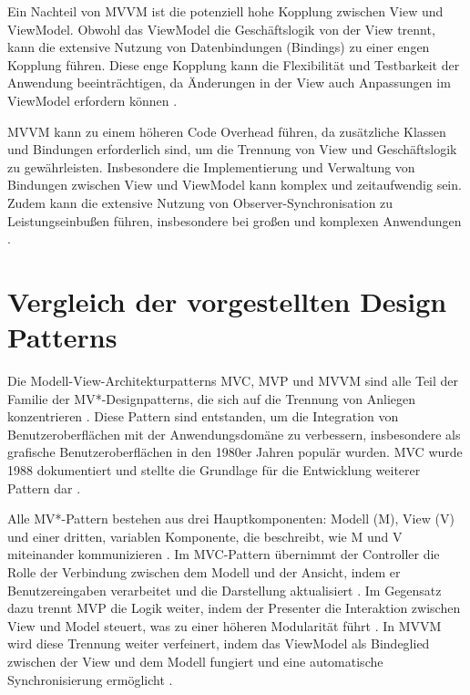Ein Nachteil von \ac{MVVM} ist die potenziell hohe Kopplung zwischen View und ViewModel. Obwohl das ViewModel die Geschäftslogik von der View trennt, kann die extensive Nutzung von Datenbindungen (Bindings) zu einer engen Kopplung führen. Diese enge Kopplung kann die Flexibilität und Testbarkeit der Anwendung beeinträchtigen, da Änderungen in der View auch Anpassungen im ViewModel erfordern können \cite{arcos2018comparative}.

\ac{MVVM} kann zu einem höheren Code Overhead führen, da zusätzliche Klassen und Bindungen erforderlich sind, um die Trennung von View und Geschäftslogik zu gewährleisten. Insbesondere die Implementierung und Verwaltung von Bindungen zwischen View und ViewModel kann komplex und zeitaufwendig sein. Zudem kann die extensive Nutzung von Observer-Synchronisation zu Leistungseinbußen führen, insbesondere bei großen und komplexen Anwendungen \cite{arcos2018comparative}.

\section{Vergleich der vorgestellten Design Patterns}
Die Modell-View-Architekturpatterns \ac{MVC}, \ac{MVP} und \ac{MVVM} sind alle Teil der Familie der MV*-Designpatterns, die sich auf die Trennung von Anliegen konzentrieren \cite{aihara2012mvc}. Diese Pattern sind entstanden, um die Integration von Benutzeroberflächen mit der Anwendungsdomäne zu verbessern, insbesondere als grafische Benutzeroberflächen in den 1980er Jahren populär wurden. \ac{MVC} wurde 1988 dokumentiert und stellte die Grundlage für die Entwicklung weiterer Pattern dar \cite{aihara2012mvc}.

Alle MV*-Pattern bestehen aus drei Hauptkomponenten: Modell (M), View (V) und einer dritten, variablen Komponente, die beschreibt, wie M und V miteinander kommunizieren \cite{aihara2012mvc}. Im \ac{MVC}-Pattern übernimmt der Controller die Rolle der Verbindung zwischen dem Modell und der Ansicht, indem er Benutzereingaben verarbeitet und die Darstellung aktualisiert \cite{aihara2012mvc}. Im Gegensatz dazu trennt \ac{MVP} die Logik weiter, indem der Presenter die Interaktion zwischen View und Model steuert, was zu einer höheren Modularität führt \cite{aihara2012mvc}. In \ac{MVVM} wird diese Trennung weiter verfeinert, indem das ViewModel als Bindeglied zwischen der View und dem Modell fungiert und eine automatische Synchronisierung ermöglicht \cite{aihara2012mvc}.
